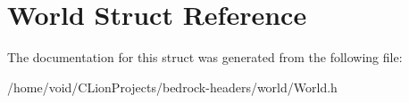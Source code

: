 \hypertarget{struct_world}{}\section{World Struct Reference}
\label{struct_world}


The documentation for this struct was generated from the following file\+:\begin{DoxyCompactItemize}
\item 
/home/void/\+C\+Lion\+Projects/bedrock-\/headers/world/World.\+h\end{DoxyCompactItemize}
